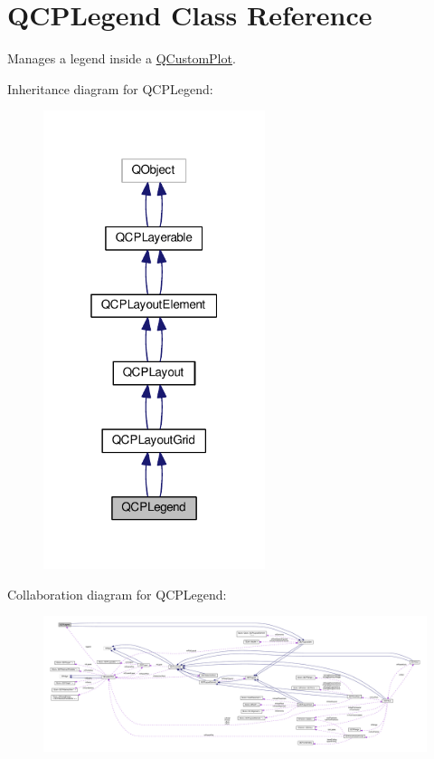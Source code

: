 \hypertarget{class_q_c_p_legend}{}\section{Q\+C\+P\+Legend Class Reference}
\label{class_q_c_p_legend}


Manages a legend inside a \hyperlink{class_q_custom_plot}{Q\+Custom\+Plot}.  




Inheritance diagram for Q\+C\+P\+Legend\+:\nopagebreak
\begin{figure}[H]
\begin{center}
\leavevmode
\includegraphics[width=184pt]{class_q_c_p_legend__inherit__graph}
\end{center}
\end{figure}


Collaboration diagram for Q\+C\+P\+Legend\+:\nopagebreak
\begin{figure}[H]
\begin{center}
\leavevmode
\includegraphics[width=350pt]{class_q_c_p_legend__coll__graph}
\end{center}
\end{figure}
